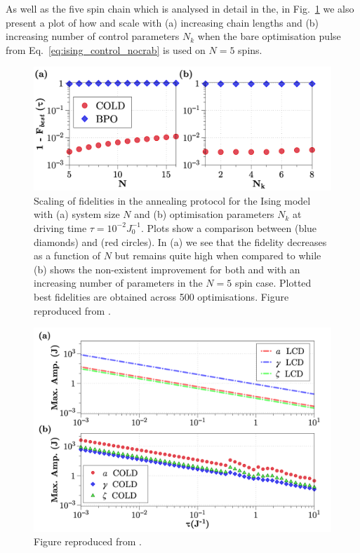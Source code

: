 As well as the five spin chain which is analysed in detail in the, in Fig.~\ref{fig:ising_scalingN} we also present a plot of how   and  scale with (a) increasing chain lengths and (b) increasing number of control parameters $N_k$ when the bare optimisation pulse from Eq.~\eqref{eq:ising_control_nocrab} is used on $N=5$ spins. 

\begin{figure}[t!]
    \centering
    \includegraphics[width=\linewidth]{images/ScalingN.png} \caption[Plots of how final state fidelities scale using COLD and BPO for different system sizes and optimisable parameters.]{Scaling of fidelities in the annealing protocol for the Ising model with (a) system size $N$ and (b) optimisation parameters $N_k$ at driving time $\tau=10^{-2}J_0^{-1}$. Plots show a comparison between  (blue diamonds) and  (red circles).  In (a) we see that the  fidelity decreases as a function of $N$ but remains quite high when compared to  while (b) shows the non-existent improvement for both  and  with an increasing number of parameters in the $N=5$ spin case. Plotted best fidelities are obtained across 500 optimisations. Figure reproduced from \cite{cepaite_cold_2023}.}\label{fig:ising_scalingN}
\end{figure}

\begin{figure}[h]
    \centering
    \includegraphics[width=0.8\linewidth]{images/MaxAmp.png} \caption[Plots of maximum amplitudes of LCD drives for the Ising spin chain.]{Figure reproduced from \cite{cepaite_cold_2023}.}\label{fig:ising_maxamp}
\end{figure}

